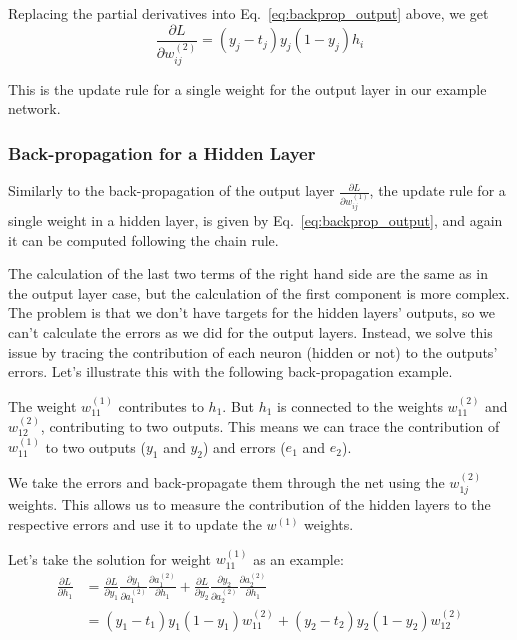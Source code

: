 Replacing the partial derivatives into Eq.~\ref{eq:backprop_output} above, we get
\begin{equation}
  \frac{\partial L}{\partial w^{(2)}_{ij}} = (y_j - t_j) y_j(1 - y_j) h_i
\end{equation}

This is the update rule for a single weight for the output layer in our example network.

\subsubsection{Back-propagation for a Hidden Layer}
Similarly to the back-propagation of the output layer $\frac{\partial L}{\partial w^{(1)}_{ij}}$, the update rule for a single weight in a hidden layer, is given by Eq.~\ref{eq:backprop_output}, and again it can be computed following the chain rule.

The calculation of the last two terms of the right hand side are the same as in the output layer case, but the calculation of the first component is more complex.
The problem is that we don’t have targets for the hidden layers’ outputs, so we can’t calculate the errors as we did for the output layers.
Instead, we solve this issue by tracing the contribution of each neuron (hidden or not) to the outputs’ errors. Let’s illustrate this with the following back-propagation example.

The weight $w^{(1)}_{11}$ contributes to $h_1$. But $h_1$ is connected to the weights $w^{(2)}_{11}$ and $w^{(2)}_{12}$, contributing to two outputs. This means we can trace the contribution of $w^{(1)}_{11}$ to two outputs ($y_1$ and $y_2$) and errors ($e_1$ and $e_2$).

We take the errors and back-propagate them through the net using the $w^{(2)}_{1j}$ weights. This allows us to measure the contribution of the hidden layers to the respective errors and use it to update the $w^{(1)}$ weights.

Let’s take the solution for weight $w^{(1)}_{11}$ as an example:
\begin{align}
	\frac{\partial L}{\partial h_1} &= \frac{\partial L}{\partial y_1}\frac{\partial y_1}{\partial a^{(2)}_1}\frac{\partial a^{(2)}_1}{\partial h_1} + \frac{\partial L}{\partial y_2}\frac{\partial y_2}{\partial a^{(2)}_2}\frac{\partial a^{(2)}_2}{\partial h_1} \\ 
	& = (y_1 - t_1)y_1(1-y_1)w^{(2)}_{11} + (y_2 - t_2)y_2(1-y_2)w^{(2)}_{12}
\end{align}

